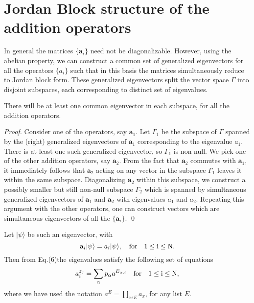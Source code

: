 \documentclass[11pt,a4paper]{book}
\begin{document}
\section{Jordan Block structure of the addition operators}\label{sec:ch5.4}
In general the matrices $\{\mathbf{a}_i\}$ need not be diagonalizable. 
However, using the abelian property, we can construct a common set of
generalized eigenvectors for all the operators $\{a_i\}$ such that in this basis
the matrices simultaneously reduce to Jordan block form. These 
generalized eigenvectors split the vector space $\Gamma$ into
disjoint subspaces, each corresponding to distinct set of eigenvalues.
\begin{lemma}
There will be at least one common eigenvector in
each subspace, for all the addition operators. 
\end{lemma}
\begin{proof}
Consider one of the operators, say $\mathbf{a}_1$.
Let $\Gamma_1$
be the subspace of $\Gamma$ spanned by the (right) generalized eigenvectors of 
$\mathbf{a}_1$ corresponding to the eigenvalue $a_1$. There is at
least one such generalized eigenvector, so $\Gamma_1$ is non-null. We pick one
of the other addition operators, say $\mathbf{a}_2$. From the fact that
$\mathbf{a}_2$ commutes with $\mathbf{a}_1$, it immediately follows
that $\mathbf{a}_2$ acting on any vector in the subspace $\Gamma_1$
leaves it within the same subspace. Diagonalizing $\mathbf{a}_2$
within this subspace, we construct a possibly smaller but still
non-null subspace $\Gamma_2$ which is spanned by simultaneous 
generalized eigenvectors of $\mathbf{a}_1$ and $\mathbf{a}_2$ with eigenvalues
$a_1$ and $a_2$. Repeating this argument with the other operators,
one can construct vectors which are simultaneous eigenvectors of 
all the $\{\mathbf{a}_i\}$. \qed
\end{proof}

Let $|\psi \rangle$ be such an eigenvector, with
\begin{equation}
  \mathbf{a}_i|\psi\rangle = a_i |\psi \rangle \rm{,~ ~ ~ for ~} \rm{~
}\rm{~}1 \le i \le N. 
\end{equation}
Then from Eq.($6$)the eigenvalues satisfy the following set of equations
\begin{equation}
  a_i^{z_c} = \sum_{\alpha}p_{\alpha}a^{E_{\alpha,i}}\rm{~ ~ ~ for
~ } \rm{~ }\rm{~}1 \le i \le N,
\end{equation}
where we have used the notation
$a^{E}=\displaystyle\prod_{x\epsilon E}a_{x}$, for any list $E$.
\end{document}
